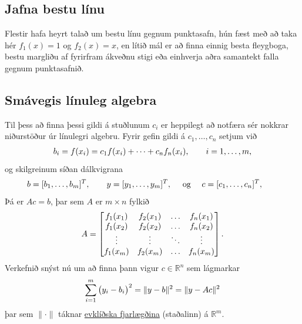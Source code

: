 \documentclass[letterpaper,10pt,icelandic]{sphinxmanual}
\begin{document}

\subsection{Jafna bestu línu}
\label{kafli03:jafna-bestu-linu}\label{kafli03:index-24}
Flestir hafa heyrt talað um bestu línu gegnum punktasafn, hún fæst með
að taka hér \(f_1(x) = 1\) og \(f_2(x) = x\), en lítið mál er að
finna einnig besta fleygboga, bestu margliðu af fyrirfram ákveðnu stigi
eða einhverja aðra samantekt falla gegnum punktasafnið.


\subsection{Smávegis línuleg algebra}
\label{kafli03:smavegis-linuleg-algebra}
Til þess að finna þessi gildi á stuðlunum \(c_i\) er heppilegt að
notfæra sér nokkrar niðurstöður úr línulegri algebru. Fyrir gefin gildi
á \(c_1,\dots,c_n\) setjum við
\begin{gather}
\begin{split}b_i = f(x_i) = c_1f(x_i) + \cdots + c_n f_n(x_i),
    \qquad i=1,\dots,m,\end{split}\notag
\end{gather}
og skilgreinum síðan dálkvigrana
\begin{gather}
\begin{split}b = [b_1,\dots,b_m]^T,\qquad
    y = [y_1,\dots,y_m]^T,\quad \text{ og } \quad
    c = [c_1,\dots,c_n]^T,\qquad\end{split}\notag
\end{gather}
Þá er \(Ac=b\), þar sem \(A\) er \(m\times n\) fylkið
\begin{gather}
\begin{split}A = \left[\begin{matrix}
        f_1(x_1)& f_2(x_1) & \dots & f_n(x_1) \\
        f_1(x_2)& f_2(x_2) & \dots & f_n(x_2) \\
        \vdots &\vdots &\ddots &\vdots \\
        f_1(x_m)& f_2(x_m) & \dots & f_n(x_m)
    \end{matrix}\right].\end{split}\notag
\end{gather}
Verkefnið snýst nú um að finna þann vigur \(c\in {{\mathbb  R}}^n\)
sem lágmarkar
\begin{gather}
\begin{split}\sum_{i=1}^m \big(y_i-b_i\big)^2
    = \| y - b \|^2 = \| y - Ac \|^2\end{split}\notag
\end{gather}
þar sem \(\|\cdot\|\) táknar \href{https://en.wikipedia.org/wiki/Euclidean\_distance}{evklíðska fjarlægðina}
(staðalinn) á \({{\mathbb  R}}^m\).
\end{document}
